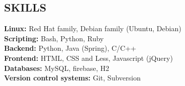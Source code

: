 \documentclass[margin,line]{resume}
\begin{document}
\begin{resume}
    \section{\mysidestyle \textbf{\large{S}\small{KILLS} }}

    \textbf{Linux:} Red Hat family, Debian family (Ubuntu, Debian)\\
    \textbf{Scripting:} Bash, Python, Ruby\\
    \textbf{Backend:} Python, Java (Spring), C/C++\\
    \textbf{Frontend:} HTML, CSS and Less, Javascript (jQuery)\\
    \textbf{Databases:} MySQL, firebase, H2\\
    \textbf{Version control systems:} Git, Subversion\\
    
\end{resume}
\end{document}
